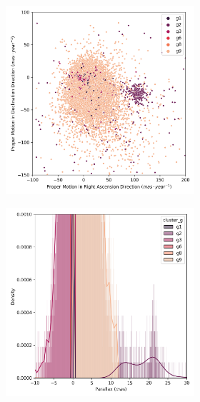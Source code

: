 \documentclass[11pt, a4paper, english]{book}
\begin{document}
\begin{figure}[H]
\begin{subfigure}{0.9\textwidth}
\begin{subfigure}[t]{0.30\textwidth}
    \end{subfigure}
  \end{subfigure}
  \caption{Melotte 25 KMeans characterization.}
  \centering
  \begin{subfigure}{0.9\textwidth}
    \centering
    \begin{subfigure}[t]{0.30\textwidth}
      \centering
      \includegraphics[width=\textwidth]{../figures/melotte_25/dec_pm_melotte_25.png}
    \end{subfigure}
    \hfill
    \begin{subfigure}[t]{0.30\textwidth}
      \centering
      \includegraphics[width=\textwidth]{../figures/melotte_25/dec_parallax_melotte_25.png}

\end{subfigure}
\end{subfigure}
\end{figure}
\end{document}
